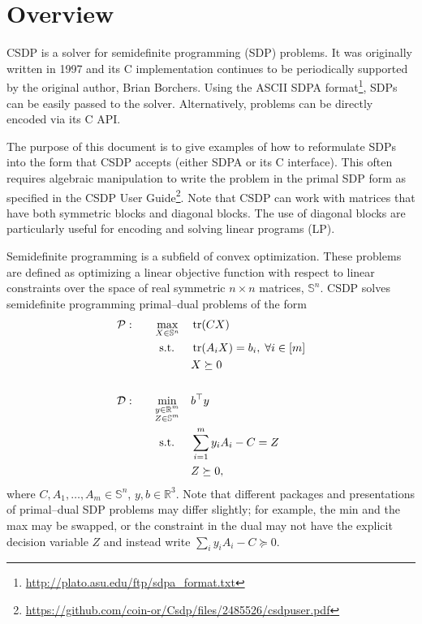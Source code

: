 \documentclass[a4paper]{article}
\begin{document}
\section*{Overview}
CSDP is a solver for semidefinite programming (SDP) problems.
It was originally written in 1997 and its C implementation continues to be periodically supported by the original author, Brian Borchers.
Using the ASCII SDPA format\footnote{\url{http://plato.asu.edu/ftp/sdpa_format.txt}}, SDPs can be easily passed to the solver.
Alternatively, problems can be directly encoded via its C API.

The purpose of this document is to give examples of how to reformulate SDPs into the form that CSDP accepts (either SDPA or its C interface).
This often requires algebraic manipulation to write the problem in the primal SDP form as specified in the CSDP User Guide\footnote{\url{https://github.com/coin-or/Csdp/files/2485526/csdpuser.pdf}}.
Note that CSDP can work with matrices that have both symmetric blocks and diagonal blocks.
The use of diagonal blocks are particularly useful for encoding and solving linear programs (LP).

Semidefinite programming is a subfield of convex optimization.
These problems are defined as optimizing a linear objective function with respect to linear constraints over the space of real symmetric $n\times n$ matrices, $\mathbb{S}^n$.
CSDP solves semidefinite programming primal--dual problems of the form
\begin{equation*}
\begin{aligned}
\mathcal{P}: \quad && \max_{X\in\mathbb{S}^n}                 \quad & \tr(CX) \\
                   && \textrm{s.t. } \quad & \tr(A_iX) = b_i, \;\forall i\in[m] \\
                   &&                     & X \succeq 0 \\ \\
\mathcal{D}: \quad && \min_{\substack{y\in\mathbb{R}^m\\Z\in\mathbb{S}^m}}\quad & b^\top y \\
                   && \textrm{s.t. } \quad & \sum_{i=1}^m y_i A_i - C = Z\\
                   &&                     & Z \succeq 0,
\end{aligned}
\end{equation*}
where $C, A_1,\dots,A_m\in\mathbb{S}^n$, $y,b\in\mathbb{R}^3$.
Note that different packages and presentations of primal--dual SDP problems may differ slightly; for example, the min and the max may be swapped, or the constraint in the dual may not have the explicit decision variable $Z$ and instead write $\sum_i y_i A_i - C\succeq 0$.
\end{document}
